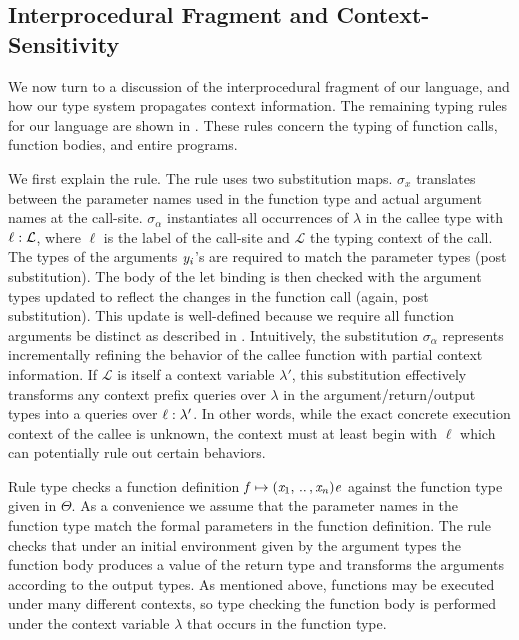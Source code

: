 \subsection{Interprocedural Fragment and Context-Sensitivity}
\label{sec:cs}
We now turn to a discussion of the interprocedural fragment of our
language, and how our type system propagates context information. The remaining
typing rules for our language are shown in .
These rules concern the typing of function calls, function bodies, and
entire programs.

We first explain the  rule. The rule uses two substitution
maps. $\sigma_{x}$ translates between the parameter names used in the
function type and actual argument names at the call-site. $\sigma_{\alpha}$
instantiates all occurrences of $\lambda$ in the callee type with
$\ell  :  \mathcal{L}$, where $\ell$ is the label of the call-site and $\mathcal{L}$
the typing context of the call.  The types of the arguments $\mathit{y_{\mathit{i}}}$'s
are required to match the parameter types (post substitution). The
body of the let binding is then checked with the argument types
updated to reflect the changes in the function call (again, post
substitution). This update is well-defined because we require all
function arguments be distinct as described in .
Intuitively, the substitution $\sigma_{\alpha}$ represents incrementally
refining the behavior of the callee function with partial context
information.  If $\mathcal{L}$ is itself a context variable $\lambda'$, this
substitution effectively transforms any context prefix queries over
$\lambda$ in the argument/return/output types into a queries over
$\ell  :  \lambda'$.  In other words, while the exact concrete execution context
of the callee is unknown, the context must at least begin with $\ell$
which can potentially rule out certain behaviors.

Rule  type checks a function definition
$\mathit{f}  \mapsto  (  \mathit{x_{{\mathrm{1}}}}  , \, .. \, ,  \mathit{x_{\mathit{n}}}  )  \mathit{e}$ against the function type given in $\Theta$.
As a convenience we assume that the parameter
names in the function type match the formal parameters in the function
definition. The rule checks that under an initial environment given
by the argument types the function body produces a value of the
return type and transforms the arguments according to the output types.
As mentioned above, functions may be executed under many different contexts,
so type checking the function body is performed under the context
variable $\lambda$ that occurs in the function type.

